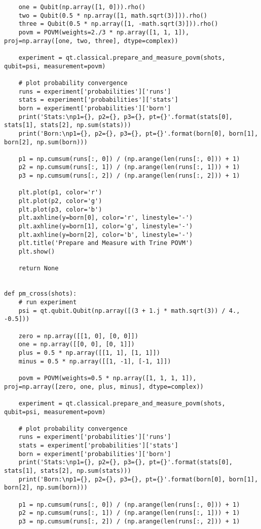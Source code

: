 \begin{verbatim}
    one = Qubit(np.array([1, 0])).rho()
    two = Qubit(0.5 * np.array([1, math.sqrt(3)])).rho()
    three = Qubit(0.5 * np.array([1, -math.sqrt(3)])).rho()
    povm = POVM(weights=2./3 * np.array([1, 1, 1]), proj=np.array([one, two, three], dtype=complex))

    experiment = qt.classical.prepare_and_measure_povm(shots, qubit=psi, measurement=povm)

    # plot probability convergence
    runs = experiment['probabilities']['runs']
    stats = experiment['probabilities']['stats']
    born = experiment['probabilities']['born']
    print('Stats:\np1={}, p2={}, p3={}, pt={}'.format(stats[0], stats[1], stats[2], np.sum(stats)))
    print('Born:\np1={}, p2={}, p3={}, pt={}'.format(born[0], born[1], born[2], np.sum(born)))

    p1 = np.cumsum(runs[:, 0]) / (np.arange(len(runs[:, 0])) + 1)
    p2 = np.cumsum(runs[:, 1]) / (np.arange(len(runs[:, 1])) + 1)
    p3 = np.cumsum(runs[:, 2]) / (np.arange(len(runs[:, 2])) + 1)

    plt.plot(p1, color='r')
    plt.plot(p2, color='g')
    plt.plot(p3, color='b')
    plt.axhline(y=born[0], color='r', linestyle='-')
    plt.axhline(y=born[1], color='g', linestyle='-')
    plt.axhline(y=born[2], color='b', linestyle='-')
    plt.title('Prepare and Measure with Trine POVM')
    plt.show()

    return None


def pm_cross(shots):
    # run experiment
    psi = qt.qubit.Qubit(np.array([(3 + 1.j * math.sqrt(3)) / 4., -0.5]))

    zero = np.array([[1, 0], [0, 0]])
    one = np.array([[0, 0], [0, 1]])
    plus = 0.5 * np.array([[1, 1], [1, 1]])
    minus = 0.5 * np.array([[1, -1], [-1, 1]])

    povm = POVM(weights=0.5 * np.array([1, 1, 1, 1]), proj=np.array([zero, one, plus, minus], dtype=complex))

    experiment = qt.classical.prepare_and_measure_povm(shots, qubit=psi, measurement=povm)

    # plot probability convergence
    runs = experiment['probabilities']['runs']
    stats = experiment['probabilities']['stats']
    born = experiment['probabilities']['born']
    print('Stats:\np1={}, p2={}, p3={}, pt={}'.format(stats[0], stats[1], stats[2], np.sum(stats)))
    print('Born:\np1={}, p2={}, p3={}, pt={}'.format(born[0], born[1], born[2], np.sum(born)))

    p1 = np.cumsum(runs[:, 0]) / (np.arange(len(runs[:, 0])) + 1)
    p2 = np.cumsum(runs[:, 1]) / (np.arange(len(runs[:, 1])) + 1)
    p3 = np.cumsum(runs[:, 2]) / (np.arange(len(runs[:, 2])) + 1)


\end{verbatim}
